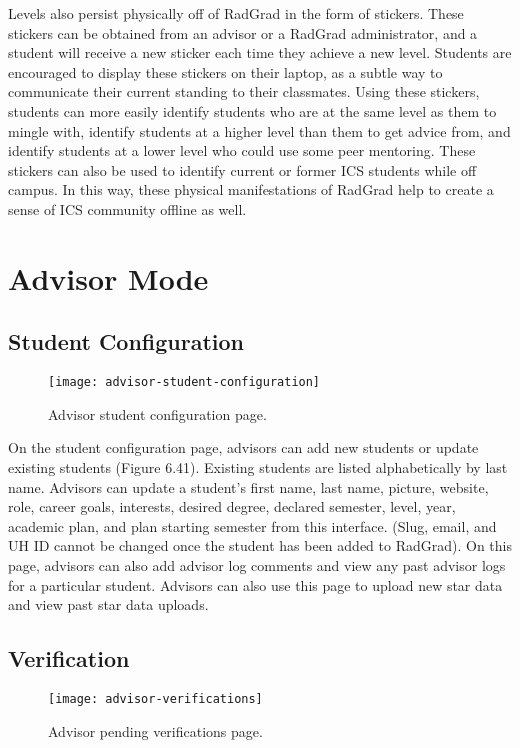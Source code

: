Levels also persist physically off of RadGrad in the form of stickers. These stickers can be obtained from an advisor or a RadGrad administrator, and a student will receive a new sticker each time they achieve a new level. Students are encouraged to display these stickers on their laptop, as a subtle way to communicate their current standing to their classmates. Using these stickers, students can more easily identify students who are at the same level as them to mingle with, identify students at a higher level than them to get advice from, and identify students at a lower level who could use some peer mentoring. These stickers can also be used to identify current or former ICS students while off campus. In this way, these physical manifestations of RadGrad help to create a sense of ICS community offline as well. 

\section{Advisor Mode}
\subsection{Student Configuration}
\begin{figure}[htbp!]
\centering
\texttt{[image: advisor-student-configuration]}
\caption{Advisor student configuration page.}
\end{figure}
On the student configuration page, advisors can add new students or update existing students (Figure 6.41). Existing students are listed alphabetically by last name. Advisors can update a student's first name, last name, picture, website, role, career goals, interests, desired degree, declared semester, level, year, academic plan, and plan starting semester from this interface. (Slug, email, and UH ID cannot be changed once the student has been added to RadGrad). On this page, advisors can also add advisor log comments and view any past advisor logs for a particular student. Advisors can also use this page to upload new star data and view past star data uploads. 
\subsection{Verification}
\begin{figure}[htbp!]
\centering
\texttt{[image: advisor-verifications]}
\caption{Advisor pending verifications page.}
\end{figure}

